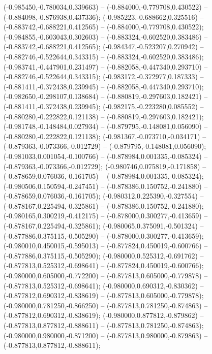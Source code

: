 (-0.985450,-0.780034,0.339663) -- (-0.884000,-0.779708,0.430522) -- (-0.884098,-0.876938,0.437336);
 (-0.985223,-0.688662,0.325516) -- (-0.883742,-0.688221,0.412565) -- (-0.884000,-0.779708,0.430522);
 (-0.984855,-0.603043,0.302603) -- (-0.883324,-0.602520,0.383486) -- (-0.883742,-0.688221,0.412565);
 (-0.984347,-0.523207,0.270942) -- (-0.882746,-0.522644,0.343315) -- (-0.883324,-0.602520,0.383486);
 (-0.983741,-0.447901,0.231497) -- (-0.882058,-0.447340,0.293710) -- (-0.882746,-0.522644,0.343315);
 (-0.983172,-0.372977,0.187333) -- (-0.881411,-0.372438,0.239945) -- (-0.882058,-0.447340,0.293710);
 (-0.982650,-0.298107,0.138684) -- (-0.880819,-0.297603,0.182421) -- (-0.881411,-0.372438,0.239945);
 (-0.982175,-0.223280,0.085552) -- (-0.880280,-0.222822,0.121138) -- (-0.880819,-0.297603,0.182421);
 (-0.981748,-0.148484,0.027934) -- (-0.879795,-0.148081,0.056090) -- (-0.880280,-0.222822,0.121138);
 (-0.981367,-0.073710,-0.034171) -- (-0.879363,-0.073366,-0.012729) -- (-0.879795,-0.148081,0.056090);
 (-0.981033,0.001054,-0.100766) -- (-0.878984,0.001335,-0.085324) -- (-0.879363,-0.073366,-0.012729);
 (-0.980746,0.075819,-0.171858) -- (-0.878659,0.076036,-0.161705) -- (-0.878984,0.001335,-0.085324);
 (-0.980506,0.150594,-0.247451) -- (-0.878386,0.150752,-0.241880) -- (-0.878659,0.076036,-0.161705);
 (-0.980312,0.225390,-0.327554) -- (-0.878167,0.225494,-0.325861) -- (-0.878386,0.150752,-0.241880);
 (-0.980165,0.300219,-0.412175) -- (-0.878000,0.300277,-0.413659) -- (-0.878167,0.225494,-0.325861);
 (-0.980065,0.375091,-0.501324) -- (-0.877886,0.375115,-0.505290) -- (-0.878000,0.300277,-0.413659);
 (-0.980010,0.450015,-0.595013) -- (-0.877824,0.450019,-0.600766) -- (-0.877886,0.375115,-0.505290);
 (-0.980000,0.525312,-0.691762) -- (-0.877813,0.525312,-0.698641) -- (-0.877824,0.450019,-0.600766);
 (-0.980000,0.605000,-0.772200) -- (-0.877813,0.605000,-0.779878) -- (-0.877813,0.525312,-0.698641);
 (-0.980000,0.690312,-0.830362) -- (-0.877812,0.690312,-0.838619) -- (-0.877813,0.605000,-0.779878);
 (-0.980000,0.781250,-0.866250) -- (-0.877813,0.781250,-0.874863) -- (-0.877812,0.690312,-0.838619);
 (-0.980000,0.877812,-0.879862) -- (-0.877813,0.877812,-0.888611) -- (-0.877813,0.781250,-0.874863);
 (-0.980000,0.980000,-0.871200) -- (-0.877813,0.980000,-0.879863) -- (-0.877813,0.877812,-0.888611);
